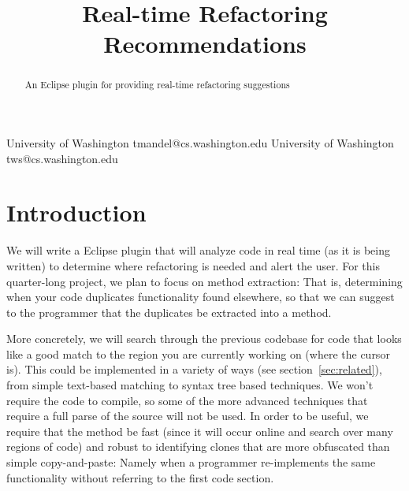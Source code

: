 \documentclass[preprint,10pt]{sigplanconf}
\begin{document}
%

\title{Real-time Refactoring Recommendations}
           {University of Washington}
           {tmandel@cs.washington.edu}
           {University of Washington}
           {tws@cs.washington.edu}
\maketitle
\begin{abstract}
An Eclipse plugin for providing real-time refactoring suggestions
\end{abstract}



\section{Introduction}

We will write a Eclipse plugin that will analyze code in real time (as it is being written) to determine where refactoring is needed and alert the user. For this quarter-long project, we plan to focus on method extraction: That is, determining when your code duplicates functionality found elsewhere, so that we can suggest to the programmer that the duplicates be extracted into a method. 

More concretely, we will search through the previous codebase for code that looks like a good match to the region you are currently working on (where the cursor is). This could be implemented in a variety of ways (see section~\ref{sec:related}), from simple text-based matching to syntax tree based techniques. We won't require the code to compile, so some of the more advanced techniques that require a full parse of the source will not be used. In order to be useful, we require that the method be fast (since it will occur online and search over many regions of code) and robust to identifying clones that are more obfuscated than simple copy-and-paste: Namely when a programmer re-implements the same functionality without referring to the first code section.
\end{document}
